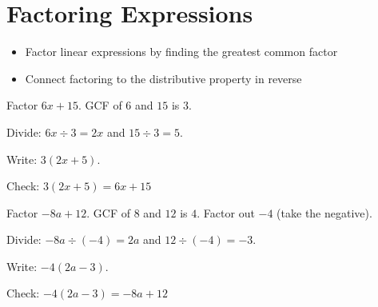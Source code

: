 \section{Factoring Expressions}

\begin{stepGoal}
\begin{itemize}
    \item Factor linear expressions by finding the greatest common factor
    \item Connect factoring to the distributive property in reverse
\end{itemize}
\end{stepGoal}

\begin{stepVocabBox}
\end{stepVocabBox}

\begin{stepsCard}
\end{stepsCard}

\begin{stepExample}{Factor $6x + 15$.}
     GCF of $6$ and $15$ is $3$.

     Divide: $6x \div 3 = 2x$ and $15 \div 3 = 5$.

     Write: $3(2x + 5)$.

     Check: $3(2x + 5) = 6x + 15$ \checkmark
\end{stepExample}

\begin{stepExample}{Factor $-8a + 12$.}
     GCF of $8$ and $12$ is $4$. Factor out $-4$ (take the negative).

     Divide: $-8a \div (-4) = 2a$ and $12 \div (-4) = -3$.

     Write: $-4(2a - 3)$.

     Check: $-4(2a - 3) = -8a + 12$ \checkmark
\end{stepExample}

